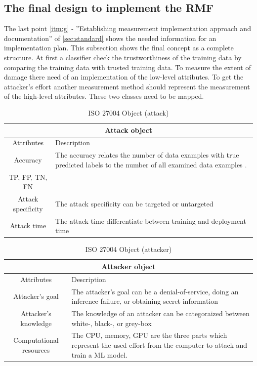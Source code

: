\subsection{The final design to implement the RMF}
\label{sec:final_design}

The last point \ref{itm:g} - ''Establishing measurement implementation approach and documentation'' of \ref{sec:standard} shows the needed information for an implementation plan. This subsection shows the final concept as a complete structure. At first a classifier check the trustworthiness of the training data by comparing the training data with trusted training data. To measure the extent of damage there need of an implementation of the low-level attributes. To get the attacker's effort another measurement method should represent the measurement of the high-level attributes. These two classes need to be mapped.

\begin{table}[h]
\centering
  \begin{tabular}{|c|p{10cm}|}
  \hline
  \multicolumn{2}{|c|}{Attack object} \\
  \hline
  \rowcolor{lightgray} Attributes & Description \\ [0.5ex]
  \hline
  Accuracy & The accuracy relates the number of data examples with true predicted labels to the number of all examined data examples \cite{9783960101925}. \\
  \hline
  TP, FP, TN, FN & \\
  \hline
  Attack specificity & The attack specificity can be targeted or untargeted \\
  \hline
  Attack time & The attack time differentiate between training and deployment time \\
  \hline
  \end{tabular}
\caption{ISO 27004 Object (attack)}
\label{tab:attack}
\end{table}

\begin{table}[h]
\centering
  \begin{tabular}{| c | p{10cm} |}
  \hline
  \multicolumn{2}{|c|}{Attacker object} \\
  \hline
  \rowcolor{lightgray} Attributes & Description \\ [0.5ex]
  \hline
  Attacker's goal & The attacker's goal can be a denial-of-service, doing an inference failure, or obtaining secret information \\
  \hline
  Attacker's knowledge & The knowledge of an attacker can be categoraized between white-, black-, or grey-box \\
  \hline
  Computational resources & The CPU, memory, GPU are the three parts which represent the used effort from the computer to attack and train a ML model. \\
  \hline
  \end{tabular}
\caption{ISO 27004 Object (attacker)}
\label{tab:attacker}
\end{table}
